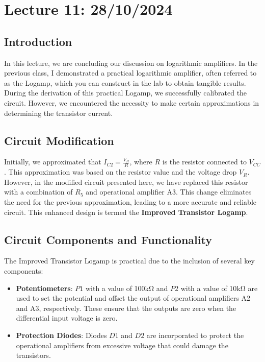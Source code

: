 \newpage

\section{Lecture 11: 28/10/2024}

\subsection{Introduction}
In this lecture, we are concluding our discussion on logarithmic amplifiers. In the previous class, I demonstrated a practical logarithmic amplifier, often referred to as the Logamp, which you can construct in the lab to obtain tangible results. During the derivation of this practical Logamp, we successfully calibrated the circuit. However, we encountered the necessity to make certain approximations in determining the transistor current.

\subsection{Circuit Modification}
Initially, we approximated that \( I_{C2} = \frac{V_R}{R} \), where \( R \) is the resistor connected to \( V_{CC} \). This approximation was based on the resistor value and the voltage drop \( V_R \). However, in the modified circuit presented here, we have replaced this resistor with a combination of \( R_5 \) and operational amplifier A3. This change eliminates the need for the previous approximation, leading to a more accurate and reliable circuit. This enhanced design is termed the \textbf{Improved Transistor Logamp}.

\subsection{Circuit Components and Functionality}
The Improved Transistor Logamp is practical due to the inclusion of several key components:
\begin{itemize}
    \item \textbf{Potentiometers}: \( P1 \) with a value of 100kΩ and \( P2 \) with a value of 10kΩ are used to set the potential and offset the output of operational amplifiers A2 and A3, respectively. These ensure that the outputs are zero when the differential input voltage is zero.
    \item \textbf{Protection Diodes}: Diodes \( D1 \) and \( D2 \) are incorporated to protect the operational amplifiers from excessive voltage that could damage the transistors.
\end{itemize}

